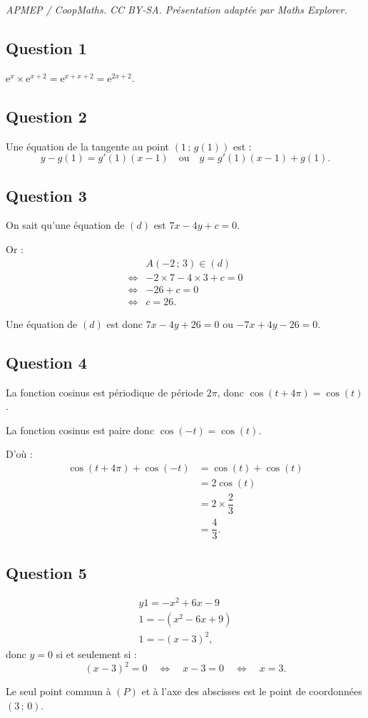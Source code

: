 \documentclass[10pt]{article}
\providecommand{\e}{{\mathrm{e}}}
\begin{document}
\noindent\textit{APMEP / CoopMaths. CC BY-SA. Présentation adaptée par Maths Explorer.}\par\medskip
\subsection*{Question 1}

\(\e^x \times \e^{x + 2} = \e^{x + x + 2} = \e^{2x + 2}\).

\subsection*{Question 2}

Une équation de la tangente au point \((1 \,;\, g(1))\) est :
\[
y - g(1) = g'(1)(x - 1) \quad \text{ou} \quad y = g'(1)(x - 1) + g(1).
\]

\subsection*{Question 3}

On sait qu'une équation de \((d)\) est \(7x - 4y + c = 0\).

Or :
\begin{align*}
&A(-2\,;\,3) \in (d) \\
\iff &-2 \times 7 - 4 \times 3 + c = 0 \\
\iff &-26 + c = 0 \\
\iff &c = 26.
\end{align*}

Une équation de \((d)\) est donc \(7x - 4y + 26 = 0\) ou \(-7x + 4y - 26 = 0\).

\subsection*{Question 4}

La fonction cosinus est périodique de période \(2\pi\), donc \(\cos(t + 4\pi) = \cos(t)\).

La fonction cosinus est paire donc \(\cos(-t) = \cos(t)\).

D'où :
\begin{align*}
\cos(t + 4\pi) + \cos(-t) &= \cos(t) + \cos(t) \\
&= 2\cos(t) \\
&= 2 \times \dfrac{2}{3} \\
&= \dfrac{4}{3}.
\end{align*}

\subsection*{Question 5}

\begin{align*}
y 1= -x^2 + 6x - 9 \\
1= -(x^2 - 6x + 9) \\
1= -(x - 3)^2,
\end{align*}
donc \(y = 0\) si et seulement si :
\[
(x - 3)^2 = 0 \quad \iff \quad x - 3 = 0 \quad \iff \quad x = 3.
\]

Le seul point commun à \((P)\) et à l'axe des abscisses est le point de coordonnées \((3 \,;\, 0)\).
\end{document}
